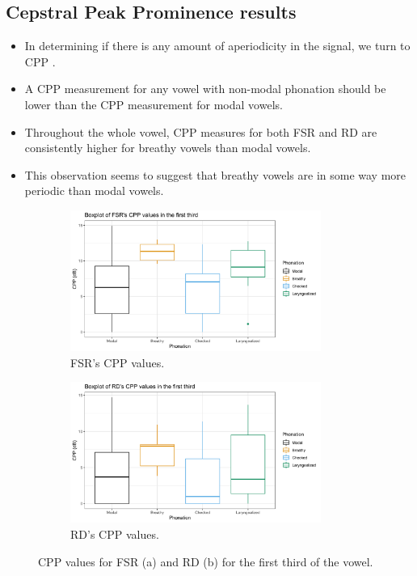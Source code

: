 \documentclass[12pt, letterpaper]{article}
\begin{document}
\subsection{Cepstral Peak Prominence results} \label{sec:CPP}

\begin{itemize}
	\item In determining if there is any amount of aperiodicity in the signal, we turn to CPP \citep{hillenbrandAcousticCorrelatesBreathy1994,hillenbrandAcousticCorrelatesBreathy1996}.
	\item A CPP measurement for any vowel with non-modal phonation should be lower than the CPP
	measurement for modal vowels.
	\item Throughout the whole vowel, CPP measures for both FSR and RD are consistently higher for breathy vowels than modal vowels. 
	\item This observation seems to suggest that breathy vowels are in some way more periodic than modal vowels. 
\end{itemize}
\begin{figure}[!h]
	\centering
	\begin{subfigure}{.5\textwidth}
		\centering
		\includegraphics[width=0.9\textwidth]{../mean_FSR_cpp_First.png}
		\caption{FSR's CPP values.}
		\label{fig:FSRcppfirst} 
	\end{subfigure}%
	\begin{subfigure}{.5\textwidth}
		\centering
		\includegraphics[width=0.9\textwidth]{../mean_RD_cpp_First.png}
		\caption{RD's CPP values.}
		\label{fig:RDcppfirst} 
	\end{subfigure}
	\caption{CPP values for FSR (a) and RD (b) for the first third of the vowel. }
	\label{fig:cppfirst}
\end{figure}
\end{document}
